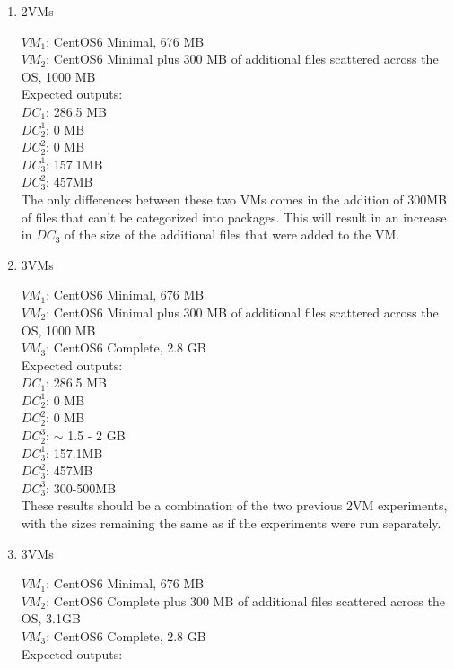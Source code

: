 \begin{enumerate}
\item 2VMs

$VM_1$: CentOS6 Minimal, 676 MB\\
$VM_2$: CentOS6 Minimal plus 300 MB of additional files scattered across the OS, 1000 MB\\

Expected outputs:\\

$DC_1$: 286.5 MB\\
$DC_2^1$: 0 MB\\
$DC_2^2$: 0 MB\\
$DC_3^1$: 157.1MB\\
$DC_3^2$: 457MB\\

The only differences between these two VMs comes in the addition of 300MB of files that can't be categorized into packages. This will result in an increase in $DC_3$ of the size of the additional files that were added to the VM.

\item 3VMs

$VM_1$: CentOS6 Minimal, 676 MB\\
$VM_2$: CentOS6 Minimal plus 300 MB of additional files scattered across the OS, 1000 MB\\
$VM_3$: CentOS6 Complete, 2.8 GB\\

Expected outputs:\\

$DC_1$: 286.5 MB\\
$DC_2^1$: 0 MB\\
$DC_2^2$: 0 MB\\
$DC_2^3$: $\sim$ 1.5 - 2 GB\\
$DC_3^1$: 157.1MB\\
$DC_3^2$: 457MB\\
$DC_3^3$: 300-500MB\\

These results should be a combination of the two previous 2VM experiments, with the sizes remaining the same as if the experiments were run separately.
\item 3VMs

$VM_1$: CentOS6 Minimal, 676 MB\\
$VM_2$: CentOS6 Complete plus 300 MB of additional files scattered across the OS, 3.1GB\\
$VM_3$: CentOS6 Complete, 2.8 GB\\

Expected outputs:\\


\end{enumerate}
